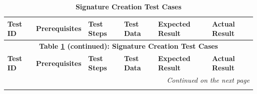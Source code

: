 \documentclass[]{final_report}
\theoremstyle{definition}
\begin{document}
\begin{longtable}{|l|p{2.5cm}|p{2.8cm}|p{2cm}|p{2cm}|p{2cm}|}
  \caption{\textbf{Signature Creation Test Cases}} \label{tab:signature_creation} \\
  \hline
  \textbf{Test ID} & \textbf{Prerequisites} & \textbf{Test Steps} & \textbf{Test Data} & \textbf{Expected Result} & \textbf{Actual Result} \\
  \hline
  \endfirsthead

  \multicolumn{6}{c}{\textbf{Table \ref{tab:signature_creation} (continued): Signature Creation Test Cases}} \\
  \hline
  \textbf{Test ID} & \textbf{Prerequisites} & \textbf{Test Steps} & \textbf{Test Data} & \textbf{Expected Result} & \textbf{Actual Result} \\
  \hline
  \endhead

  \hline
  \multicolumn{6}{r}{\textit{Continued on the next page}} \\
  \endfoot

  \hline
  \endlastfoot


\end{longtable}
\end{document}
